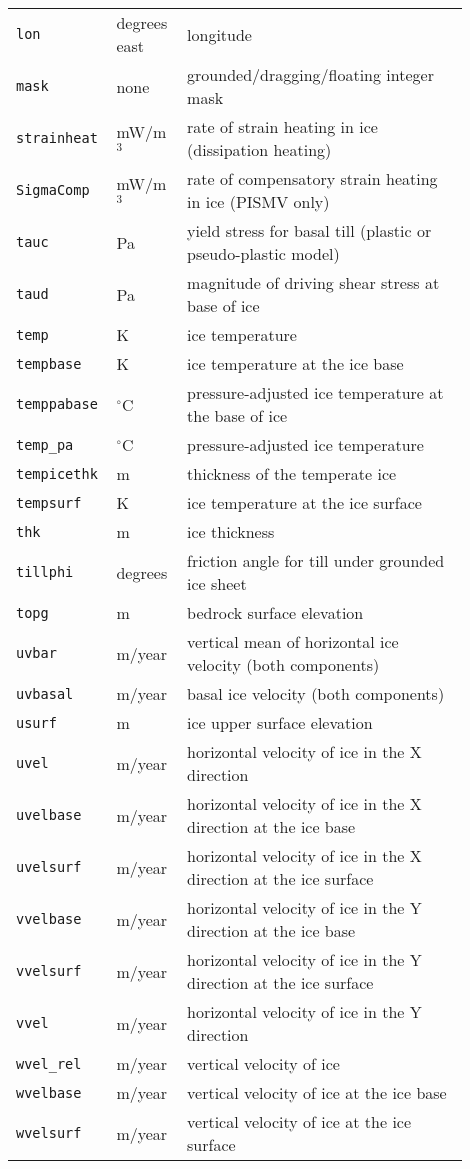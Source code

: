 \begin{center}
\begin{xtabular}{p{0.15\linewidth}p{0.15\linewidth}p{0.6\linewidth}}
    \texttt{lon} & degrees east & longitude \\
    \texttt{mask} & none & grounded/dragging/floating integer mask \\
    \texttt{strainheat} & mW/m$^{3}$ & rate of strain heating in ice (dissipation heating) \\
    \texttt{SigmaComp} & mW/m$^{3}$ & rate of compensatory strain heating in ice (PISMV only)\\
    \texttt{tauc} & Pa & yield stress for basal till (plastic or pseudo-plastic model) \\
    \texttt{taud} & Pa & magnitude of driving shear stress at base of ice \\
    \texttt{temp} & K & ice temperature \\
    \texttt{tempbase} & K & ice temperature at the ice base\\
    \texttt{temppabase} & $^{\circ}$C & pressure-adjusted ice temperature at the base of ice\\
    \texttt{temp_pa} & $^{\circ}$C & pressure-adjusted ice temperature \\
    \texttt{tempicethk} & m & thickness of the temperate ice \\
    \texttt{tempsurf} & K & ice temperature at the ice surface\\
    \texttt{thk} & m & ice thickness\\
    \texttt{tillphi} & degrees & friction angle for till under grounded ice sheet \\
    \texttt{topg} & m & bedrock surface elevation \\
    \texttt{uvbar} & m/year & vertical mean of horizontal ice velocity (both components) \\
    \texttt{uvbasal} & m/year & basal ice velocity (both components)\\
    \texttt{usurf} & m & ice upper surface elevation \\
    \texttt{uvel} & m/year & horizontal velocity of ice in the X direction \\
    \texttt{uvelbase} & m/year & horizontal velocity of ice in the X direction
    at the ice base\\
    \texttt{uvelsurf} & m/year & horizontal velocity of ice in the X direction
    at the ice surface\\
   \texttt{vvelbase} & m/year & horizontal velocity of ice in the Y direction
    at the ice base\\
    \texttt{vvelsurf} & m/year & horizontal velocity of ice in the Y direction
    at the ice surface\\
   \texttt{vvel} & m/year & horizontal velocity of ice in the Y direction \\
    \texttt{wvel_rel} & m/year & vertical velocity of ice \\
    \texttt{wvelbase} & m/year &vertical velocity of ice at the ice base\\
    \texttt{wvelsurf} & m/year & vertical velocity of ice at the ice surface\\
  \end{xtabular}
\end{center}

